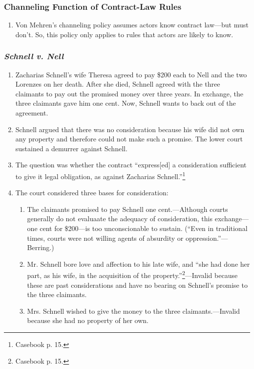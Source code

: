 \subsubsection{Channeling Function of Contract-Law Rules}

\begin{enumerate}
    \item Von Mehren's channeling policy assumes actors know contract 
    law---but must don't. So, this policy only applies to rules that actors 
    are likely to know. 
\end{enumerate}

\subsubsection{\emph{Schnell v. Nell}}

\begin{enumerate}
    \item Zacharias Schnell's wife Theresa agreed to pay \$200 each to Nell and 
    the two Lorenzes on her death. After she died, Schnell agreed with the 
    three claimants to pay out the promised money over three years. In 
    exchange, the three claimants gave him one cent. Now, Schnell wants to 
    back out of the agreement.
    \item Schnell argued that there was no consideration because his wife did 
    not own any property and therefore could not make such a promise. The 
    lower court sustained a demurrer against Schnell.
    \item The question was whether the contract ``express[ed] a consideration 
    sufficient to give it legal obligation, as against Zacharias 
    Schnell.''\footnote{Casebook p. 15.}
    \item The court considered three bases for consideration:
    \begin{enumerate}
        \item The claimants promised to pay Schnell one cent.---Although 
        courts generally do not evaluaate the adequacy of consideration, this 
        exchange---one cent for \$200---is too unconscionable to 
        sustain. (``Even in traditional times, courts were not willing agents 
        of absurdity or oppression.''---Berring.)
        \item Mr. Schnell bore love and affection to his late wife, and ``she 
        had done her part, as his wife, in the acquisition of the 
        property.''\footnote{Casebook p. 15.}---Invalid because these are past 
        considerations and have no bearing on Schnell's promise to the three 
        claimants.
        \item Mrs. Schnell wished to give the money to the three 
        claimants.---Invalid because she had no property of her own.
    \end{enumerate}
\end{enumerate}

